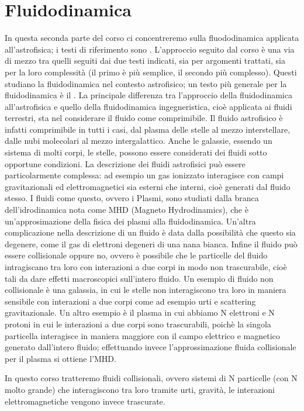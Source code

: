 \chapter{Fluidodinamica}
	\label{chap:Fluidodinamica}
In questa seconda parte del corso ci concentreremo sulla fluododinamica applicata all'astrofisica; i testi di riferimento sono \cite{book:Clarke} \cite{book:Pringle}. L'approccio seguito dal corso è una via di mezzo tra quelli seguiti dai due testi indicati, sia per argomenti trattati, sia per la loro complessità (il primo è più semplice, il secondo più complesso). Questi studiano la fluidodinamica nel contesto astrofisico; un testo più generale per la fluidodinamica è il \cite{book:Batchelor}. La principale differenza tra l'approccio della fluidodinamica all'astrofisica e quello della fluidodinamica ingegneristica, cioè applicata ai fluidi terrestri, sta nel considerare il fluido come comprimibile. Il fluido astrofisico è infatti comprimibile in tutti i casi, dal plasma delle stelle al mezzo interstellare, dalle nubi molecolari al mezzo intergalattico. Anche le galassie, essendo un sistema di molti corpi, le stelle, possono essere considerati dei fluidi sotto opportune condizioni.
La descrizione dei fluidi astrofisici può essere particolarmente complessa: ad esempio un gas ionizzato interagisce con campi gravitazionali ed elettromagnetici sia esterni che interni, cioè generati dal fluido stesso. I fluidi come questo, ovvero i Plasmi, sono studiati dalla branca dell'idrodinamica nota come MHD (Magneto Hydrodinamics), che è un'approsimazione della fisica dei plasmi alla fluidodinamica. Un'altra complicazione nella descrizione di un fluido è data dalla possibilità che questo sia degenere, come il gas di elettroni degeneri di una nana bianca. Infine il fluido può essere collisionale oppure no, ovvero è possibile che le particelle del fluido intragiscano tra loro con interazioni a due corpi in modo non trascurabile, cioè tali da dare effetti macroscopici sull'intero fluido. Un esempio di fluido non collisionale è una galassia, in cui le stelle non interagiscono tra loro in maniera sensibile con interazioni a due corpi come ad esempio urti e scattering gravitazionale. Un altro esempio è il plasma in cui abbiamo N elettroni e N protoni in cui le interazioni a due corpi sono trascurabili, poichè la singola particella interagisce in maniera maggiore con il campo elettrico e magnetico generato dall'intero fluido; effettuando invece l'approssimazione fluida collisionale per il plasma si ottiene l'MHD.

In questo corso tratteremo fluidi collisionali, ovvero sistemi di N particelle (con N molto grande) che interagiscono tra loro tramite urti, gravità, le interazioni elettromagnetiche vengono invece trascurate.

